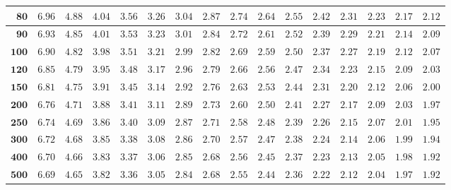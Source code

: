 \begin{customTableWrapper}{1.4}
\begin{longtable}{|r|r|r|r|r|r|r|r|r|r|r|r|r|r|r|r|}
    ${\mathbf{80}}$  & ${6.96}$   & ${4.88}$   & ${4.04}$   & ${3.56}$   & ${3.26}$   & ${3.04}$   & ${2.87}$   & ${2.74}$   & ${2.64}$   & ${2.55}$   & ${2.42}$   & ${2.31}$   & ${2.23}$   & ${2.17}$   & ${2.12}$   \\ \hline 
    ${\mathbf{90}}$  & ${6.93}$   & ${4.85}$   & ${4.01}$   & ${3.53}$   & ${3.23}$   & ${3.01}$   & ${2.84}$   & ${2.72}$   & ${2.61}$   & ${2.52}$   & ${2.39}$   & ${2.29}$   & ${2.21}$   & ${2.14}$   & ${2.09}$   \\ \hline 
    ${\mathbf{100}}$  & ${6.90}$   & ${4.82}$   & ${3.98}$   & ${3.51}$   & ${3.21}$   & ${2.99}$   & ${2.82}$   & ${2.69}$   & ${2.59}$   & ${2.50}$   & ${2.37}$   & ${2.27}$   & ${2.19}$   & ${2.12}$   & ${2.07}$   \\ \hline 
    ${\mathbf{120}}$  & ${6.85}$   & ${4.79}$   & ${3.95}$   & ${3.48}$   & ${3.17}$   & ${2.96}$   & ${2.79}$   & ${2.66}$   & ${2.56}$   & ${2.47}$   & ${2.34}$   & ${2.23}$   & ${2.15}$   & ${2.09}$   & ${2.03}$   \\ \hline 
    ${\mathbf{150}}$  & ${6.81}$   & ${4.75}$   & ${3.91}$   & ${3.45}$   & ${3.14}$   & ${2.92}$   & ${2.76}$   & ${2.63}$   & ${2.53}$   & ${2.44}$   & ${2.31}$   & ${2.20}$   & ${2.12}$   & ${2.06}$   & ${2.00}$   \\ \hline 
    ${\mathbf{200}}$  & ${6.76}$   & ${4.71}$   & ${3.88}$   & ${3.41}$   & ${3.11}$   & ${2.89}$   & ${2.73}$   & ${2.60}$   & ${2.50}$   & ${2.41}$   & ${2.27}$   & ${2.17}$   & ${2.09}$   & ${2.03}$   & ${1.97}$   \\ \hline 
    ${\mathbf{250}}$  & ${6.74}$   & ${4.69}$   & ${3.86}$   & ${3.40}$   & ${3.09}$   & ${2.87}$   & ${2.71}$   & ${2.58}$   & ${2.48}$   & ${2.39}$   & ${2.26}$   & ${2.15}$   & ${2.07}$   & ${2.01}$   & ${1.95}$   \\ \hline 
    ${\mathbf{300}}$  & ${6.72}$   & ${4.68}$   & ${3.85}$   & ${3.38}$   & ${3.08}$   & ${2.86}$   & ${2.70}$   & ${2.57}$   & ${2.47}$   & ${2.38}$   & ${2.24}$   & ${2.14}$   & ${2.06}$   & ${1.99}$   & ${1.94}$   \\ \hline 
    ${\mathbf{400}}$  & ${6.70}$   & ${4.66}$   & ${3.83}$   & ${3.37}$   & ${3.06}$   & ${2.85}$   & ${2.68}$   & ${2.56}$   & ${2.45}$   & ${2.37}$   & ${2.23}$   & ${2.13}$   & ${2.05}$   & ${1.98}$   & ${1.92}$   \\ \hline 
    ${\mathbf{500}}$  & ${6.69}$   & ${4.65}$   & ${3.82}$   & ${3.36}$   & ${3.05}$   & ${2.84}$   & ${2.68}$   & ${2.55}$   & ${2.44}$   & ${2.36}$   & ${2.22}$   & ${2.12}$   & ${2.04}$   & ${1.97}$   & ${1.92}$   \\ \hline 

\end{longtable}
\end{customTableWrapper}
